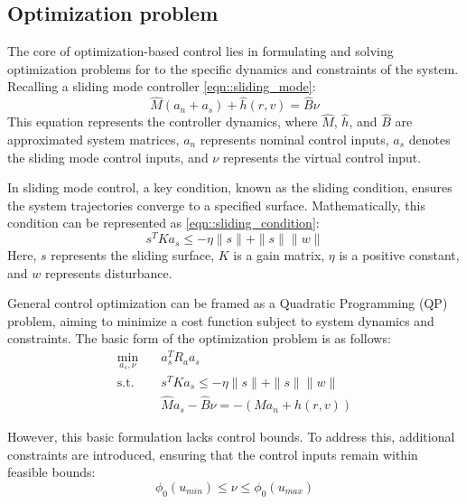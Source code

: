 \subsection{Optimization problem}

The core of optimization-based control lies in formulating and solving optimization 
problems for to the specific dynamics and constraints of the system. 
Recalling a sliding mode controller \ref{eqn::sliding_mode}:
\begin{equation*}
    \hat M(a_n + a_s)  + \hat h (r, v) = \hat B \nu
\end{equation*}
This equation represents the controller dynamics, where $\hat{M}$, $\hat{h}$, 
and $\hat{B}$ are approximated system matrices, $a_n$ represents nominal control inputs, 
$a_s$ denotes the sliding mode control inputs, and $\nu$ represents the virtual control input.

In sliding mode control, a key condition, known as the sliding condition, 
ensures the system trajectories converge to a specified surface. 
Mathematically, this condition can be represented as \ref{eqn::sliding_condition}:
\begin{equation*}
    s^TKa_s \leq -\eta \|s\| + \|s\|\|w\|
\end{equation*}
Here, $s$ represents the sliding surface, $K$ is a gain matrix, $\eta$ is a 
positive constant, and $w$ represents disturbance.

General control optimization can be framed as a Quadratic Programming (QP) 
problem, aiming to minimize a cost function subject to system dynamics 
and constraints. The basic form of the optimization problem is as follows:
\begin{equation}
\begin{aligned}
\min_{a_s, \nu} \quad & a_s^T R_a a_s \\
\textrm{s.t.} \quad & s^TKa_s \leq -\eta \|s\| + \|s\|\|w\| \\
&\hat Ma_s - \hat B\nu = -(Ma_n + h(r, v))
\end{aligned}
\end{equation}

However, this basic formulation lacks control bounds. 
To address this, additional constraints are introduced, 
ensuring that the control inputs remain within feasible bounds:
\begin{equation}
\phi_0(u_{min}) \leq \nu \leq \phi_0(u_{max})
\end{equation}


